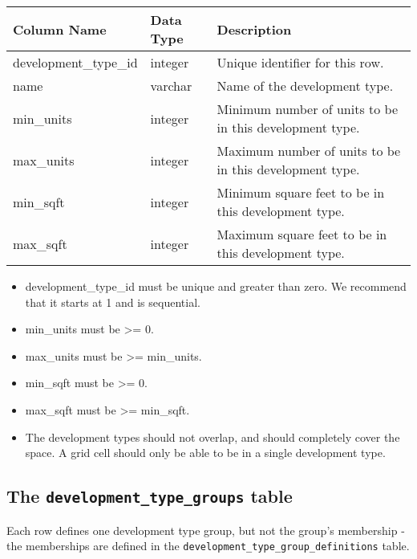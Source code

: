 \begin{tabular}{|l|l|l|}

\hline
\textbf{Column Name} & \textbf{Data Type} & \textbf{Description} \\

\hline development_type_id & integer & Unique identifier for this row.  \\

\hline name & varchar & Name of the development type.  \\

\hline min_units & integer & Minimum number of units to be in this development
type.  \\

\hline max_units & integer & Maximum number of units to be in this development
type.  \\

\hline min_sqft & integer & Minimum square feet to be in this development type.
\\

\hline max_sqft & integer & Maximum square feet to be in this development type.
\\

\hline

\end{tabular}

\begin{itemize}
\tight
\item development_type_id must be unique and greater than zero. We recommend that it starts at 1 and is sequential.
\item min_units must be \textgreater{}= 0.
\item max_units must be \textgreater{}= min_units.
\item min_sqft must be \textgreater{}= 0.
\item max_sqft must be \textgreater{}= min_sqft.
\item The development types should not overlap, and should completely cover the
space.  A grid cell should only be able to be in a single development type.
\end{itemize}

\subsection{The {\tt development_type_groups} table}
\label{sec:development-tables-type-groups}

Each row defines one development type group, but not the group's
membership - the memberships are defined in the \verb|development_type_group_definitions| table.

